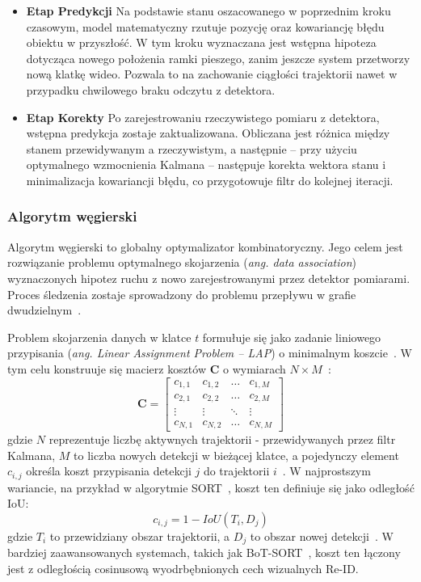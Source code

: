\begin{itemize}
  \item \textbf{Etap Predykcji} Na podstawie stanu oszacowanego w poprzednim kroku czasowym, model matematyczny rzutuje pozycję oraz kowariancję błędu obiektu w przyszłość. W tym kroku wyznaczana jest wstępna hipoteza dotycząca nowego położenia ramki pieszego, zanim jeszcze system przetworzy nową klatkę wideo. Pozwala to na zachowanie ciągłości trajektorii nawet w przypadku chwilowego braku odczytu z detektora.
  \item \textbf{Etap Korekty} Po zarejestrowaniu rzeczywistego pomiaru z detektora, wstępna predykcja zostaje zaktualizowana. Obliczana jest różnica między stanem przewidywanym a rzeczywistym, a następnie – przy użyciu optymalnego wzmocnienia Kalmana – następuje korekta wektora stanu i minimalizacja kowariancji błędu, co przygotowuje filtr do kolejnej iteracji.
\end{itemize}

\subsubsection{Algorytm węgierski}

Algorytm węgierski to globalny optymalizator kombinatoryczny. Jego celem jest rozwiązanie problemu
optymalnego skojarzenia (\textit{ang. data association}) wyznaczonych hipotez ruchu z nowo
zarejestrowanymi przez detektor pomiarami. Proces śledzenia zostaje sprowadzony do problemu
przepływu w grafie dwudzielnym~\cite{bewley2016, kuhn1955}.

Problem skojarzenia danych w klatce $t$ formułuje się jako zadanie liniowego przypisania
(\textit{ang. Linear Assignment Problem -- LAP}) o minimalnym koszcie~\cite{kuhn1955}. W tym celu
konstruuje się macierz kosztów $\mathbf{C}$ o wymiarach $N \times M$~\cite{ristani2016}:
\begin{equation}
  \mathbf{C} =
  \begin{bmatrix}
    c_{1,1} & c_{1,2} & \dots  & c_{1,M} \\
    c_{2,1} & c_{2,2} & \dots  & c_{2,M} \\
    \vdots  & \vdots  & \ddots & \vdots  \\
    c_{N,1} & c_{N,2} & \dots  & c_{N,M}
  \end{bmatrix}
\end{equation}
gdzie $N$ reprezentuje liczbę aktywnych trajektorii - przewidywanych przez filtr Kalmana, $M$ to liczba nowych detekcji w bieżącej klatce, a pojedynczy element $c_{i,j}$ określa koszt przypisania detekcji $j$ do trajektorii $i$~\cite{ristani2016}. W najprostszym wariancie, na przykład w algorytmie SORT~\cite{bewley2016}, koszt ten definiuje się jako odległość IoU:
\begin{equation}
  c_{i,j} = 1 - IoU(T_i, D_j)
\end{equation}
gdzie $T_i$ to przewidziany obszar trajektorii, a $D_j$ to obszar nowej detekcji~\cite{bewley2016}. W bardziej zaawansowanych systemach, takich jak BoT-SORT~\cite{aharon2022}, koszt ten łączony jest z odległością cosinusową wyodrbębnionych cech wizualnych Re-ID.


